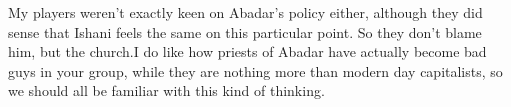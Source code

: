 My players weren't exactly keen on Abadar's policy either, although they did sense that Ishani feels the same on this particular point. So they don't blame him, but the church.I do like how priests of Abadar have actually become bad guys in your group, while they are nothing more than modern day capitalists, so we should all be familiar with this kind of thinking. 